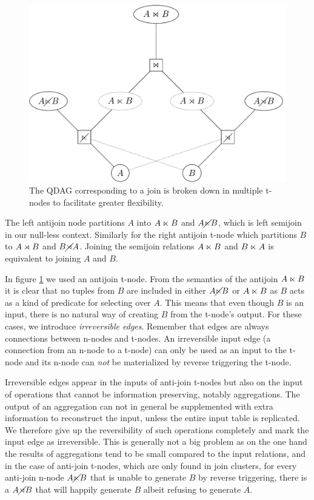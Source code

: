 \begin{figure}[H]
  \centering \includegraphics[width=.9\linewidth]{./imgs/joinnet.pdf}
  \caption{\label{fig:joinnet}The QDAG corresponding to a join is
    broken down in multiple t-nodes to facilitate greater
    flexibility.}
\end{figure}

The left antijoin node partitions \(A\) into \(A \ltimes B\) and
\(A \cancel\ltimes B\), which is left semijoin in our null-less
context. Similarly for the right antijoin t-node which partitions \(B\)
to \(A \rtimes B\) and \(B \cancel\rtimes A\). Joining the semijoin relations
\(A \ltimes B\) and \(B \ltimes A\) is equivalent to joining \(A\) and
\(B\).

In figure \ref{fig:joinnet} we used an antijoin t-node. From the
semantics of the antijoin \(A \ltimes B\) it is clear that no tuples
from \(B\) are included in either \(A \cancel\ltimes B\) or \(A \ltimes B\)
as \(B\) acts as a kind of predicate for selecting over \(A\). This
means that even though \(B\) is an input, there is no natural way of
creating \(B\) from the t-node's output. For these cases, we introduce
\emph{irreversible edges}. Remember that edges are always connections
between n-nodes and t-nodes. An irreversible input edge (a connection
from an n-node to a t-node) can only be used as an input to the t-node
and its n-node can \emph{not} be materialized by reverse triggering the
t-node.

Irreversible edges appear in the inputs of anti-join t-nodes but also
on the input of operations that cannot be information preserving,
notably aggregations. The output of an aggregation can not in general
be supplemented with extra information to reconstruct the input,
unless the entire input table is replicated. We therefore give up the
reversibility of such operations completely and mark the input edge as
irreversible. This is generally not a big problem as on the one hand
the results of aggregations tend to be small compared to the input
relations, and in the case of anti-join t-nodes, which are only found
in join clusters, for every anti-join n-node \(A \cancel\ltimes B\) that is
unable to generate \(B\) by reverse triggering, there is a \(A \cancel\rtimes
B\) that will happily generate \(B\) albeit refusing to generate
\(A\).

